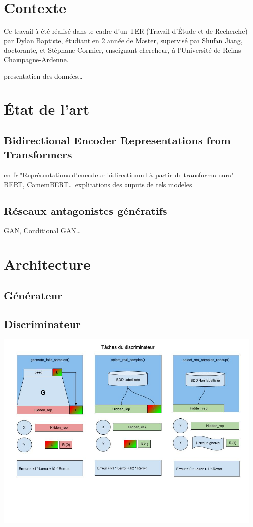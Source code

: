 \documentclass[francais,runningheads,a4paper]{llncs}
\begin{document}
\tableofcontents

\listoffigures

\listoftables

\section{Contexte}
Ce travail à été réalisé dans le cadre d'un TER (Travail d'Étude et de Recherche) par Dylan Baptiste, étudiant en 2\ieme{} année de Master, supervisé par Shufan Jiang, doctorante, et Stéphane Cormier, enseignant-chercheur, à l'Université de Reims Champagne-Ardenne.

presentation des données\dots

\section{État de l'art}

	\subsection{Bidirectional Encoder Representations from Transformers}
	en fr "Représentations d'encodeur bidirectionnel à partir de transformateurs"
	BERT, CamemBERT\dots
	explications des ouputs de tels modeles
	
	\subsection{Réseaux antagonistes génératifs}
	GAN, Conditional GAN\dots
	
\section{Architecture}
	
	\subsection{Générateur}
	
	\subsection{Discriminateur}

	\includegraphics[width=\textwidth]{tacheD.jpg}
\end{document}
